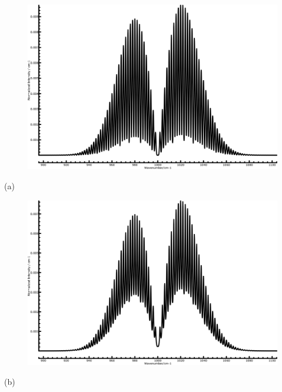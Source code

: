 \begin{center}
	\begin{minipage}{\linewidth}
		\begin{minipage}{0.5\linewidth}
			\begin{figure}[H]
				\centering \includegraphics[width=\linewidth] 						{figures/Gau1.png}
			\end{figure} 
				\centering(a) \\
		\end{minipage}
		\begin{minipage}{0.5\linewidth}
		   \begin{figure}[H]
				\centering \includegraphics[width=\linewidth]	  					{figures/Lor1.png}
			\end{figure}
				\centering(b) \\
		\end{minipage}
	\end{minipage}
		\label{fig:lorgau}
\end{center}
